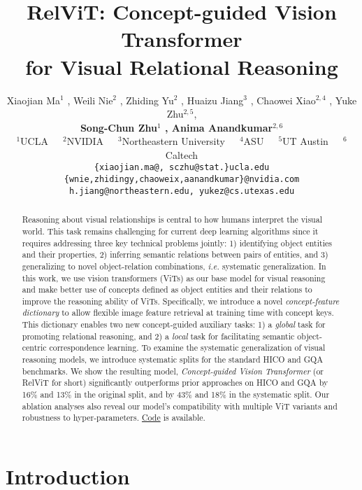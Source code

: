 \documentclass{article} \usepackage{iclr2022_conference,times}
\title{RelViT: Concept-guided Vision Transformer\\
for Visual Relational Reasoning}
\author{Xiaojian Ma$^1$ , Weili Nie$^2$ , Zhiding Yu$^2$ , Huaizu Jiang$^3$ , Chaowei Xiao$^{2,4}$ , Yuke Zhu$^{2,5}$, \\ \textbf{Song-Chun Zhu$^{1}$ , Anima Anandkumar$^{2,6}$}  \\
$^1$UCLA~~~$^2$NVIDIA~~~$^3$Northeastern University~~~$^4$ASU~~~$^5$UT Austin~~~$^6$Caltech \\
\texttt{\small{\{xiaojian.ma@, sczhu@stat.\}ucla.edu}} \\
\texttt{\small{\{wnie,zhidingy,chaoweix,aanandkumar\}@nvidia.com}}\\
\texttt{\small{h.jiang@northeastern.edu, yukez@cs.utexas.edu}}
}
\begin{document}
\maketitle

\begin{abstract}
Reasoning about visual relationships is central to how humans interpret the visual world. This task remains challenging for current deep learning algorithms since it requires addressing three key technical problems jointly: 1) identifying object entities and their properties, 2) inferring semantic relations between pairs of entities, and 3) generalizing to novel object-relation combinations, \emph{i.e.} systematic generalization. In this work, we use vision transformers (ViTs) as our base model for visual reasoning and make better use of concepts defined as object entities and their relations to improve the reasoning ability of ViTs.
Specifically, we introduce a novel \textit{concept-feature dictionary} to allow flexible image feature retrieval at training time with concept keys. This dictionary enables two new concept-guided auxiliary tasks: 1) a \textit{global} task for promoting relational reasoning, and 2) a \textit{local} task for facilitating semantic object-centric correspondence learning. 
To examine the systematic generalization of visual reasoning models, we introduce systematic splits for the standard HICO and GQA benchmarks. We show the resulting model, \emph{Concept-guided Vision Transformer} (or RelViT for short) significantly outperforms prior approaches on HICO and GQA by 16\% and 13\% in the original split, and by 43\% and 18\% in the systematic split. Our ablation analyses also reveal our model's compatibility with multiple ViT variants and robustness to hyper-parameters. \textcolor{blue}{\href{https://github.com/NVlabs/RelViT}{Code}} is available.
\end{abstract}


\vspace{-6pt}
\section{Introduction}
\vspace{-3pt}
\label{sec:intro}
\end{document}
